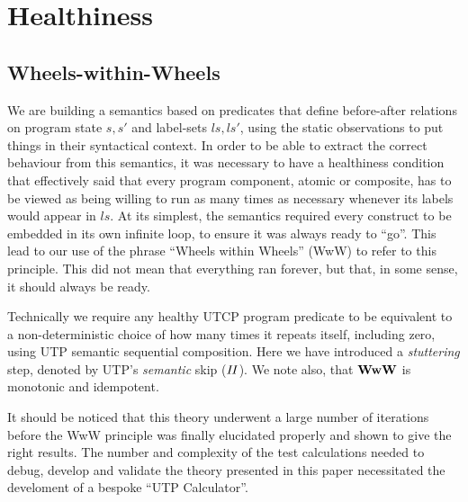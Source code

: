 \section{Healthiness}\label{sec:health}


\subsection{Wheels-within-Wheels}\label{ssec:WwW}

We are building a semantics based on predicates
that define before-after relations on program state $s,s'$
and label-sets $ls,ls'$, using the static observations
to put things in their syntactical context.
In order to be able to extract the correct behaviour from
this semantics,
it was necessary to have a healthiness condition
that effectively said that every program component,
atomic or composite, has to be viewed as being
willing to run as many times as necessary
whenever its labels would appear in $ls$.
At its simplest,
the semantics required every construct to be
embedded in its own infinite loop,
to ensure it was always ready to ``go''.
This lead to our use of the phrase ``Wheels within Wheels''
(WwW) to refer to this principle.
This did not mean that everything ran forever,
but that, in some sense, it should always be ready.

Technically we require any healthy UTCP program predicate
to be equivalent to  a non-deterministic choice
of how many times it repeats itself, including zero,
using UTP semantic sequential composition.
 \noindent
Here we have introduced a \emph{stuttering} step,
denoted by UTP's \emph{semantic} skip ($\mathit{II}$).
We note also, that $\mathbf{WwW}$ is monotonic and idempotent.

It should be noticed that this theory underwent
a large number of iterations before the WwW principle was finally
elucidated properly and shown to give the right results.
The number and complexity of the test calculations needed to debug,
develop and validate the theory presented in this paper
necessitated the develoment of a bespoke ``UTP Calculator''\cite{DBLP:conf/utp/Butterfield16}.

